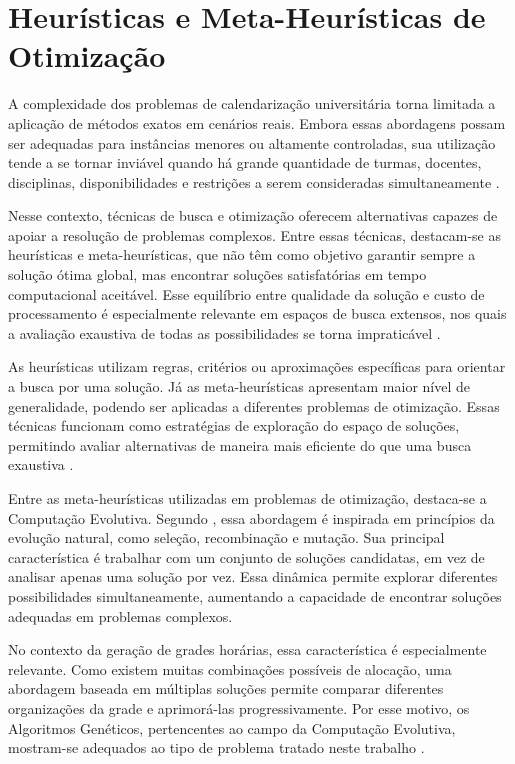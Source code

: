 \section{Heurísticas e Meta-Heurísticas de Otimização}
\label{sec:2.2}

A complexidade dos problemas de calendarização universitária torna limitada a aplicação de métodos exatos em cenários reais. Embora essas abordagens possam ser adequadas para instâncias menores ou altamente controladas, sua utilização tende a se tornar inviável quando há grande quantidade de turmas, docentes, disciplinas, disponibilidades e restrições a serem consideradas simultaneamente \cite{abdipoor2023, badoni2023}.

Nesse contexto, técnicas de busca e otimização oferecem alternativas capazes de apoiar a resolução de problemas complexos. Entre essas técnicas, destacam-se as heurísticas e meta-heurísticas, que não têm como objetivo garantir sempre a solução ótima global, mas encontrar soluções satisfatórias em tempo computacional aceitável. Esse equilíbrio entre qualidade da solução e custo de processamento é especialmente relevante em espaços de busca extensos, nos quais a avaliação exaustiva de todas as possibilidades se torna impraticável \cite{stegherr2022}.

As heurísticas utilizam regras, critérios ou aproximações específicas para orientar a busca por uma solução. Já as meta-heurísticas apresentam maior nível de generalidade, podendo ser aplicadas a diferentes problemas de otimização. Essas técnicas funcionam como estratégias de exploração do espaço de soluções, permitindo avaliar alternativas de maneira mais eficiente do que uma busca exaustiva \cite{houssein2024}.

Entre as meta-heurísticas utilizadas em problemas de otimização, destaca-se a Computação Evolutiva. Segundo , essa abordagem é inspirada em princípios da evolução natural, como seleção, recombinação e mutação. Sua principal característica é trabalhar com um conjunto de soluções candidatas, em vez de analisar apenas uma solução por vez. Essa dinâmica permite explorar diferentes possibilidades simultaneamente, aumentando a capacidade de encontrar soluções adequadas em problemas complexos.

No contexto da geração de grades horárias, essa característica é especialmente relevante. Como existem muitas combinações possíveis de alocação, uma abordagem baseada em múltiplas soluções permite comparar diferentes organizações da grade e aprimorá-las progressivamente. Por esse motivo, os Algoritmos Genéticos, pertencentes ao campo da Computação Evolutiva, mostram-se adequados ao tipo de problema tratado neste trabalho \cite{abdipoor2023, badoni2023}.
